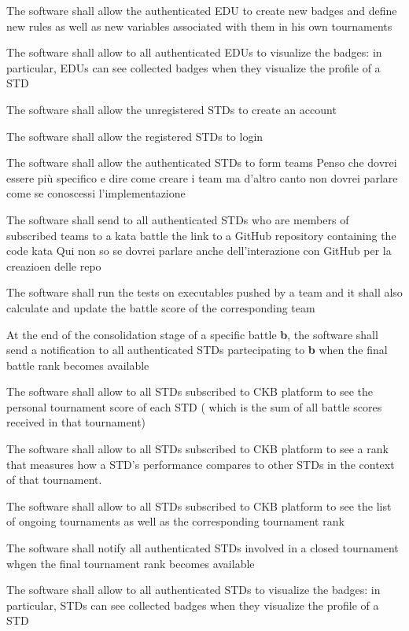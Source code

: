 \begin{requirementsenumerate}
    \item The software shall allow the authenticated EDU to create new badges and define new rules as well as new variables associated with them in his own tournaments
    \item The software shall allow to all authenticated EDUs to visualize the badges: in particular, EDUs can see collected badges when they visualize the profile of a STD
    \item The software shall allow the unregistered STDs to create an account
    \item The software shall allow the registered STDs to login
    \item The software shall allow the authenticated STDs to form teams {\color{red} Penso che dovrei essere più specifico e dire come creare i team ma d'altro canto non dovrei parlare come se conoscessi l'implementazione}
    \item The software shall send to all authenticated STDs who are members of subscribed teams to a kata battle the link to a GitHub repository containing the code kata {\color{red} Qui non so se dovrei parlare anche dell'interazione con GitHub per la creazioen delle repo}
    \item The software shall run the tests on executables pushed by a team and it shall also calculate and update the battle score of the corresponding team
    \item At the end of the consolidation stage of a specific battle \textbf{b}, the software shall send a notification to all authenticated STDs partecipating to \textbf{b} when the final battle rank becomes available
    \item The software shall allow to all STDs subscribed to CKB platform to see the personal tournament score of each STD ( which is the sum of all battle scores received in that tournament)
    \item The software shall allow to all STDs subscribed to CKB platform to see a rank that measures how a STD's performance compares to other STDs in the context of that tournament.
    \item The software shall allow to all STDs subscribed to CKB platform to see the list of ongoing tournaments as well as the corresponding tournament rank
    \item The software shall notify all authenticated STDs involved in a closed tournament whgen the final tournament rank becomes available
    \item The software shall allow to all authenticated STDs to visualize the badges: in particular, STDs can see collected badges when they visualize the profile of a STD
\end{requirementsenumerate}


